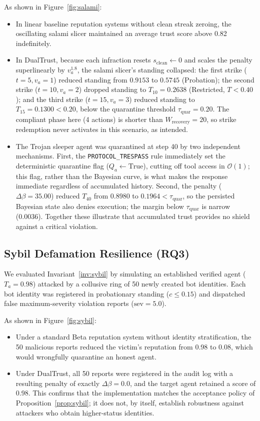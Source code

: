 \documentclass[journal]{IEEEtran}
\begin{document}
As shown in Figure~\ref{fig:salami}:
\begin{itemize}[leftmargin=12pt, topsep=2pt, itemsep=1pt]
\item In linear baseline reputation systems without clean streak zeroing, the oscillating salami slicer maintained an average trust score above 0.82 indefinitely.
\item In DualTrust, because each infraction resets $s_{\text{clean}} \leftarrow 0$ and scales the penalty superlinearly by $v_a^{1.8}$, the salami slicer's standing collapsed: the first strike ($t = 5, v_a = 1$) reduced standing from $0.9153$ to $0.5745$ (Probation); the second strike ($t = 10, v_a = 2$) dropped standing to $T_{10} = 0.2638$ (Restricted, $T < 0.40$); and the third strike ($t = 15, v_a = 3$) reduced standing to $T_{15} = 0.1300 < 0.20$, below the quarantine threshold $\tau_{\text{quar}} = 0.20$. The compliant phase here (4 actions) is shorter than $W_{\text{recovery}} = 20$, so strike redemption never activates in this scenario, as intended.
\item The Trojan sleeper agent was quarantined at step 40 by two independent mechanisms. First, the \texttt{PROTOCOL\_TRESPASS} rule immediately set the deterministic quarantine flag ($Q_a \leftarrow \text{True}$), cutting off tool access in $\mathcal{O}(1)$; this flag, rather than the Bayesian curve, is what makes the response immediate regardless of accumulated history. Second, the penalty ($\Delta\beta = 35.00$) reduced $T_{40}$ from $0.8980$ to $0.1964 < \tau_{\text{quar}}$, so the persisted Bayesian state also denies execution; the margin below $\tau_{\text{quar}}$ is narrow (0.0036). Together these illustrate that accumulated trust provides no shield against a critical violation.
\end{itemize}

\subsection{Sybil Defamation Resilience (RQ3)}
We evaluated Invariant~\ref{inv:sybil} by simulating an established verified agent ($T_a = 0.98$) attacked by a collusive ring of 50 newly created bot identities. Each bot identity was registered in probationary standing ($c \le 0.15$) and dispatched false maximum-severity violation reports ($\text{sev} = 5.0$).

As shown in Figure~\ref{fig:sybil}:
\begin{itemize}[leftmargin=12pt, topsep=2pt, itemsep=1pt]
\item Under a standard Beta reputation system without identity stratification, the 50 malicious reports reduced the victim's reputation from 0.98 to 0.08, which would wrongfully quarantine an honest agent.
\item Under DualTrust, all 50 reports were registered in the audit log with a resulting penalty of exactly $\Delta\beta = 0.0$, and the target agent retained a score of 0.98. This confirms that the implementation matches the acceptance policy of Proposition~\ref{prop:sybil}; it does not, by itself, establish robustness against attackers who obtain higher-status identities.
\end{itemize}
\end{document}

